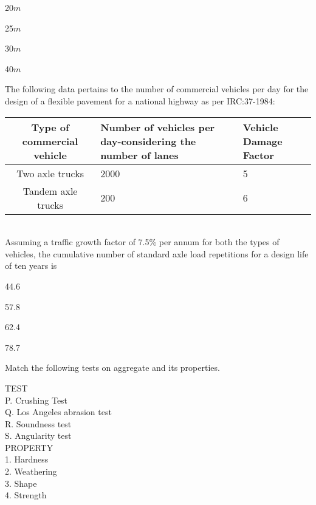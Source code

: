 \begin{enumerate}
\begin{multicols}{4}
\item 20$m$
\item 25$m$
\item 30$m$
\item 40$m$
\end{multicols}
\end{enumerate}
\item The following data pertains to the number of commercial vehicles per day for the design of a flexible pavement for a national highway as per IRC:37-1984:\\
\begin{table}[h]
    \centering
    \begin{tabular}{|c|p{5cm}|p{3cm}|}
    \hline
    Type of commercial vehicle & Number of vehicles per day-considering the number of lanes & Vehicle Damage Factor\\
    \hline
    Two axle trucks & 2000 & 5\\
    \hline
    Tandem axle trucks & 200 & 6\\
    \hline
\end{tabular}
\end{table}\\
Assuming a traffic growth factor of 7.5\% per annum for both the types of vehicles, the cumulative number of standard axle load repetitions  for a design life of ten years is
\begin{enumerate}
\begin{multicols}{4}
\item 44.6
\item 57.8
\item 62.4
\item 78.7
\end{multicols}
\end{enumerate}
\item Match the following tests on aggregate and its properties.
\begin{multicols}{2}
TEST\\
P. Crushing Test\\
Q. Los Angeles abrasion test\\
R. Soundness test\\
S. Angularity test\\
PROPERTY\\
1. Hardness\\
2. Weathering\\
3. Shape\\
4. Strength
\end{multicols}
